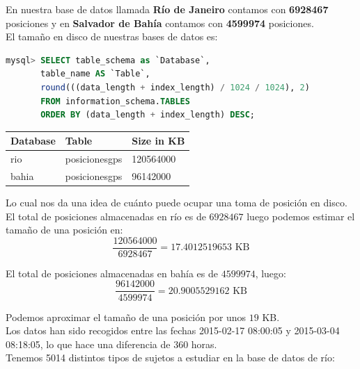 \documentclass[a4paper, 12pt]{article}
\begin{document}
En nuestra base de datos llamada \textbf{R\'io de Janeiro} contamos con \textbf{6928467} posiciones y en \textbf{Salvador de Bah\'ia} contamos con \textbf{4599974} posiciones.\\

El tama\~no en disco de nuestras bases de datos es:\\

\begin{lstlisting}[language=sql, basicstyle=\small, columns=fullflexible, frame=tbrl, showstringspaces=false]
mysql> SELECT table_schema as `Database`, 
	   table_name AS `Table`,  
	   round(((data_length + index_length) / 1024 / 1024), 2) 
	   FROM information_schema.TABLES  
	   ORDER BY (data_length + index_length) DESC;

\end{lstlisting}

\begin{center}

	\begin{tabular}{| l | l | l |}
	\hline
	\cellcolor{green!25}Database & 
	\cellcolor{green!25}Table & 
	\cellcolor{green!25}Size in KB \\
	\hline
	\hline
	rio & posicionesgps & 120564000 \\
	bahia & posicionesgps & 96142000 \\
	\hline
	\end{tabular}
\end{center}

Lo cual nos da una idea de cu\'anto puede ocupar una toma de posici\'on en disco.\\

El total de posiciones almacenadas en r\'io es de $6928467$ luego podemos estimar el tama\~no de una posici\'on en: \\
$$\frac{120564000}{6928467} = 17.4012519653 \text{ KB}$$ 

El total de posiciones almacenadas en bah\'ia es de $4599974$, luego:
$$\frac{96142000}{4599974} = 20.9005529162 \text{ KB}$$

Podemos aproximar el tama\~no de una posici\'on por unos $19$ KB. \\

Los datos han sido recogidos entre las fechas 2015-02-17 08:00:05 y 2015-03-04 08:18:05, lo que hace una diferencia de 360 horas.\\

Tenemos 5014 distintos tipos de sujetos a estudiar en la base de datos de r\'io:
\end{document}
